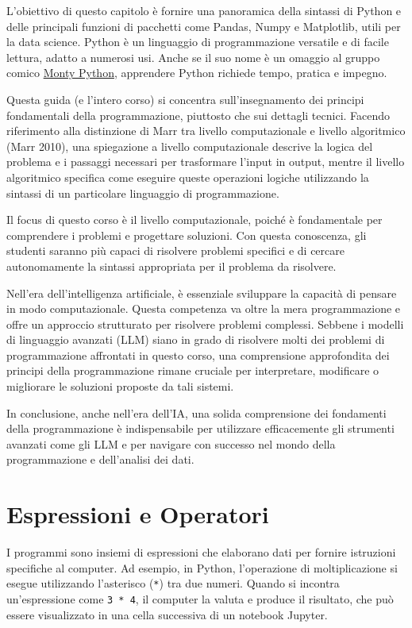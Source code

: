 \documentclass[
  letterpaper,
  krantz2]{{[}./krantz{]}}
\begin{document}
L'obiettivo di questo capitolo è fornire una panoramica della sintassi
di Python e delle principali funzioni di pacchetti come Pandas, Numpy e
Matplotlib, utili per la data science. Python è un linguaggio di
programmazione versatile e di facile lettura, adatto a numerosi usi.
Anche se il suo nome è un omaggio al gruppo comico
\href{https://www.youtube.com/results?search_query=monty+Python}{Monty
Python}, apprendere Python richiede tempo, pratica e impegno.

Questa guida (e l'intero corso) si concentra sull'insegnamento dei
principi fondamentali della programmazione, piuttosto che sui dettagli
tecnici. Facendo riferimento alla distinzione di Marr tra livello
computazionale e livello algoritmico (Marr 2010), una spiegazione a
livello computazionale descrive la logica del problema e i passaggi
necessari per trasformare l'input in output, mentre il livello
algoritmico specifica come eseguire queste operazioni logiche
utilizzando la sintassi di un particolare linguaggio di programmazione.

Il focus di questo corso è il livello computazionale, poiché è
fondamentale per comprendere i problemi e progettare soluzioni. Con
questa conoscenza, gli studenti saranno più capaci di risolvere problemi
specifici e di cercare autonomamente la sintassi appropriata per il
problema da risolvere.

Nell'era dell'intelligenza artificiale, è essenziale sviluppare la
capacità di pensare in modo computazionale. Questa competenza va oltre
la mera programmazione e offre un approccio strutturato per risolvere
problemi complessi. Sebbene i modelli di linguaggio avanzati (LLM) siano
in grado di risolvere molti dei problemi di programmazione affrontati in
questo corso, una comprensione approfondita dei principi della
programmazione rimane cruciale per interpretare, modificare o migliorare
le soluzioni proposte da tali sistemi.

In conclusione, anche nell'era dell'IA, una solida comprensione dei
fondamenti della programmazione è indispensabile per utilizzare
efficacemente gli strumenti avanzati come gli LLM e per navigare con
successo nel mondo della programmazione e dell'analisi dei dati.

\section{Espressioni e Operatori}\label{espressioni-e-operatori}

I programmi sono insiemi di espressioni che elaborano dati per fornire
istruzioni specifiche al computer. Ad esempio, in Python, l'operazione
di moltiplicazione si esegue utilizzando l'asterisco (\texttt{*}) tra
due numeri. Quando si incontra un'espressione come \texttt{3\ *\ 4}, il
computer la valuta e produce il risultato, che può essere visualizzato
in una cella successiva di un notebook Jupyter.
\end{document}
